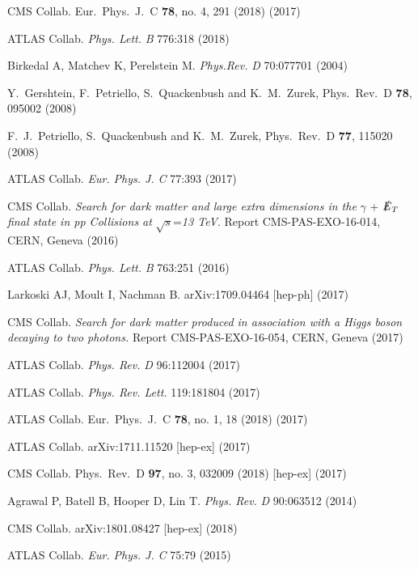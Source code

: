 \documentclass{ar-1col}
\newcommand{\MET}{\ensuremath{\slashed{E}_T}\xspace}
\begin{document}
\begin{thebibliography}{175}
{CMS Collab.} Eur.\ Phys.\ J.\ C {\bf 78}, no. 4, 291 (2018) (2017)

{ATLAS Collab.} \textit{Phys. Lett.} \textit{B} 776:318 (2018)

Birkedal A, Matchev K, Perelstein M. \textit{Phys.Rev.} \textit{D} 70:077701
(2004)

Y.~Gershtein, F.~Petriello, S.~Quackenbush and K.~M.~Zurek, Phys.\ Rev.\ D {\bf 78}, 095002 (2008)

F.~J.~Petriello, S.~Quackenbush and K.~M.~Zurek, Phys.\ Rev.\ D {\bf 77}, 115020 (2008)
  
{ATLAS Collab.} \textit{Eur. Phys. J.} \textit{C} 77:393 (2017)

CMS Collab. \textit{Search for dark matter and large extra dimensions in the} $\gamma$ + \MET \textit{final state in pp Collisions at} $\sqrt{s}$=\textit{13 TeV}. Report CMS-PAS-EXO-16-014, CERN, Geneva (2016)

{ATLAS Collab.} \textit{Phys. Lett.} \textit{B} 763:251 (2016)

Larkoski AJ, Moult I, Nachman B. arXiv:1709.04464 [hep-ph] (2017)

CMS Collab. \textit{Search for dark matter produced in association with a Higgs boson decaying to two photons.}
Report CMS-PAS-EXO-16-054, CERN, Geneva (2017)

{ATLAS Collab.} \textit{Phys. Rev.} \textit{D} 96:112004 (2017)

{ATLAS Collab.} \textit{Phys. Rev. Lett.} 119:181804 (2017)

{ATLAS Collab.}  Eur.\ Phys.\ J.\ C {\bf 78}, no. 1, 18 (2018) (2017)

{ATLAS Collab.} arXiv:1711.11520 [hep-ex] (2017)

{CMS Collab.} Phys.\ Rev.\ D {\bf 97}, no. 3, 032009 (2018) [hep-ex] (2017)

Agrawal P, Batell B, Hooper D, Lin T. \textit{Phys. Rev.}
\textit{D} 90:063512 (2014)

{CMS Collab.} arXiv:1801.08427 [hep-ex] (2018)

{ATLAS Collab}. \textit{Eur. Phys. J.} \textit{C} 75:79 (2015)


\end{thebibliography}
\end{document}
